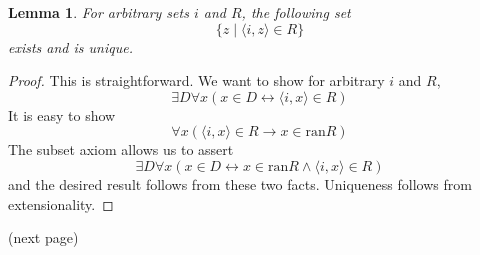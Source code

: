 \documentclass{report}
\newtheorem{lemma}[theo]{Lemma}
\begin{document}
\begin{lemma}
For arbitrary sets $i$ and $R$, the following set 
\begin{equation*}
\{z\mid\langle i,z\rangle\in R\}
\end{equation*}
exists and is unique.
\end{lemma}
\begin{proof}
This is straightforward. We want to show for arbitrary $i$ and $R$,
\begin{equation*}
\exists D\forall x(x\in D\leftrightarrow\langle i,x\rangle\in R)
\end{equation*}
It is easy to show
\begin{equation*}
\forall x(\langle i,x\rangle\in R\to x\in\text{ran}R)
\end{equation*}
The subset axiom allows us to assert
\begin{equation*}
\exists D\forall x(x\in D\leftrightarrow x\in\text{ran}R\land\langle i,x\rangle\in R)
\end{equation*}
and the desired result follows from these two facts. Uniqueness follows from extensionality.
\end{proof}
\noindent(next page)\newpage
\end{document}
